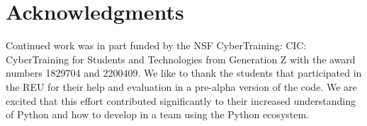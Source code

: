 \hypertarget{acknowledgments}{%
\section{Acknowledgments}\label{acknowledgments}}

Continued work was in part funded by the NSF CyberTraining: CIC:
CyberTraining for Students and Technologies from Generation Z with the
award numbers 1829704 and 2200409. We like to thank the students that
participated in the REU for their help and evaluation in a pre-alpha
version of the code. We are excited that this effort contributed
significantly to their increased understanding of Python and how to
develop in a team using the Python ecosystem.
